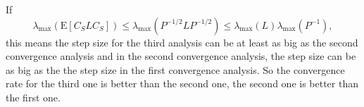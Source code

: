 \documentclass[12pt,a4paper]{article}
\begin{document}
	\newline
	If $$\lambda_{\max }\left(\mathrm{E}\left[C_{S} LC_{S}\right]\right) \leq \lambda_{\max }\left(P^{-1 / 2} L P^{-1 / 2}\right) \leq \lambda_{\max }(L) \lambda_{\max }(P^{-1}),$$
	this means the step size for the third analysis can be at least as big as the second convergence analysis and in the second convergence analysis, the step size can be as big as  the the step size in the first convergence analysis. So the convergence rate for the third one is better than the second one, the second one is better than the first one.
	
	
	
\end{document}
